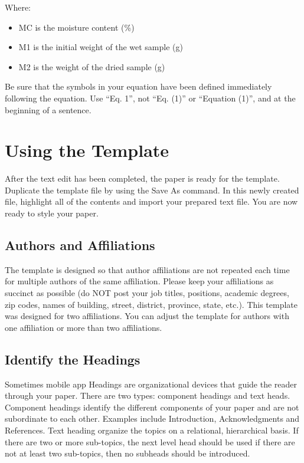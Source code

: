 \documentclass[fleqn,10pt]{thescipub} %
\begin{document}
Where:
\begin{itemize}
\item MC is the moisture content (\%)
\item M1 is the initial weight of the wet sample (g)
\item M2 is the weight of the dried sample (g)
\end{itemize}

Be sure that the symbols in your equation have been defined immediately following the equation. Use “Eq. 1”, not “Eq. (1)” or “Equation (1)”, and at the beginning of a sentence.

\section{Using the Template}
After the text edit has been completed, the paper is ready for the template. Duplicate the template file by using the Save As command. In this newly created file, highlight all of the contents and import your prepared text file. You are now ready to style your paper.

\subsection{Authors and Affiliations} 
The template is designed so that author affiliations are not repeated each time for multiple authors of the same affiliation. Please keep your affiliations as succinct as possible (do NOT post your job titles, positions, academic degrees, zip codes, names of building, street, district, province, state, etc.). This template was designed for two affiliations. You can adjust the template for authors with one affiliation or more than two affiliations.


\subsection{Identify the Headings} 
Sometimes mobile app Headings are organizational devices that guide the reader through your paper. There are two types: component headings and text heads. Component headings identify the different components of your paper and are not subordinate to each other. Examples include Introduction, Acknowledgments and References. Text heading organize the topics on a relational, hierarchical basis. If there are two or more sub-topics, the next level head should be used if there are not at least two sub-topics, then no subheads should be introduced.
\end{document}
